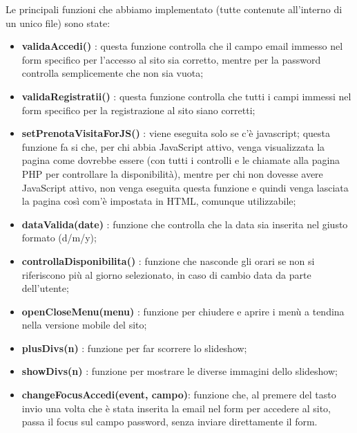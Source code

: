 Le principali funzioni che abbiamo implementato (tutte contenute all’interno di un unico file) sono state:
\begin{itemize}
\item \textbf{validaAccedi()} : questa funzione controlla che il campo email immesso nel form specifico per l'accesso al sito sia corretto, mentre per la password controlla semplicemente che non sia vuota;
\item \textbf{validaRegistratii()} : questa funzione controlla che tutti i campi immessi nel form specifico per la registrazione al sito siano corretti;
\item \textbf{setPrenotaVisitaForJS()} : viene eseguita solo se c'è javascript;
questa funzione fa si che, per chi abbia JavaScript attivo, venga visualizzata la pagina come dovrebbe essere (con tutti i controlli e le chiamate alla pagina PHP per controllare la disponibilità), mentre per chi non dovesse avere JavaScript attivo, non venga eseguita questa funzione e quindi venga lasciata la pagina così com'è impostata in HTML, comunque utilizzabile;
\item \textbf{dataValida(date)} : funzione che controlla che la data sia inserita nel giusto formato (d/m/y);
\item \textbf{controllaDisponibilita()} : funzione che nasconde gli orari se non si riferiscono più al giorno selezionato, in caso di cambio data da parte dell'utente;
\item \textbf{openCloseMenu(menu)} : funzione per chiudere e aprire i menù a tendina nella versione mobile del sito;
\item \textbf{plusDivs(n)} : funzione per far scorrere lo slideshow;
\item \textbf{showDivs(n)} : funzione per mostrare le diverse immagini dello slideshow;
\item \textbf{changeFocusAccedi(event, campo)}: funzione che, al premere del tasto invio una volta che è stata inserita la email nel form per accedere al sito, passa il focus sul campo password, senza inviare direttamente il form. \\
\end{itemize}


